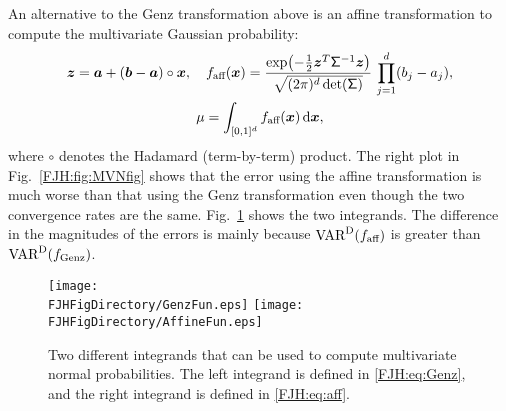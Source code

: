 \documentclass[graybox,footinfo]{svmult}
\begin{document}
\begin{FJHLesson}
\FJHLessonThree
\end{FJHLesson}

\begin{FJHLesson}
	\FJHLessonSeven
\end{FJHLesson}

An alternative to the Genz transformation above is an affine transformation to compute 
the multivariate Gaussian probability:
\begin{gather}
\label{FJH:eq:aff}
\bsz = \bsa + (\bsb-\bsa) \circ \bsx, \quad f_{\textup{aff}}(\bsx) =  \frac{\exp\bigl(- 
\frac 12 \bsz^T
\mathsf{\Sigma}^{-1} \bsz 
	\bigr)}{\sqrt{(2 \pi)^d \det(\mathsf{\Sigma})}} \, \prod_{j=1}^d (b_j - a_j), \\
\nonumber
\mu = 
	\int_{[0,1]^{d}} f_{\textup{aff}}(\bsx) \, \D \bsx,
\end{gather} 
where $\circ$ denotes the Hadamard (term-by-term) product.  The right plot in Fig.\ 
\ref{FJH:fig:MVNfig} shows that the error using the affine 
transformation is much worse than that using the Genz transformation even though the 
two convergence rates are the same.  Fig.\ \ref{FJH:fig:GenzAff} shows the two 
integrands.  The difference in the magnitudes of the errors is 
mainly because $\textup{VAR}^{\textup{D}}(f_{\textup{aff}})$ is greater than 
$\textup{VAR}^{\textup{D}}(f_{\textup{Genz}})$.


\begin{figure}
	\centering
	\texttt{[image: \\FJHFigDirectory/GenzFun.eps]} \qquad 
	\texttt{[image: \\FJHFigDirectory/AffineFun.eps]}
	\caption{Two different integrands that can be used to compute multivariate normal 
	probabilities.  The left integrand is defined in \eqref{FJH:eq:Genz}, and the right 
	integrand is defined in  \eqref{FJH:eq:aff}.
		\label{FJH:fig:GenzAff}}
\end{figure}


\begin{FJHLesson} \label{FJH:eq:lessonfour}
	\FJHLessonFour
\end{FJHLesson}
\end{document}
